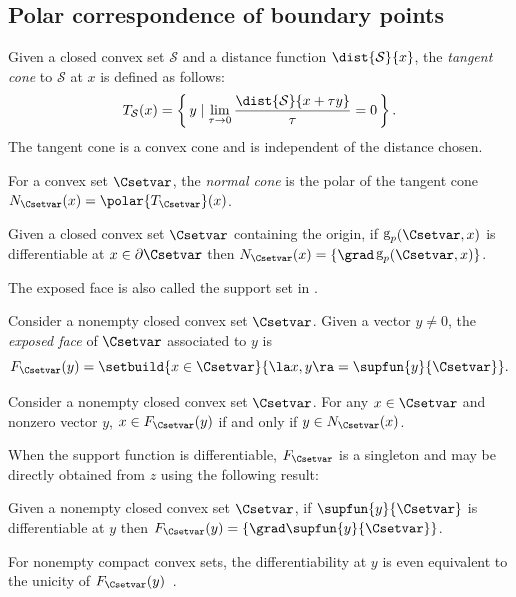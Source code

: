 \documentclass[11pt,twoside,a4paper,openright]{uclouvain-thesis}
\DeclareMathOperator{\gauge}{g}
\begin{document}
\subsection{Polar correspondence of boundary points}

\begin{mydef}
  Given a closed convex set $\mathcal{S}$ and a distance function $\dist{\mathcal{S}}{x}$,
  the \emph{tangent cone} to $\mathcal{S}$ at $x$ is defined as follows:
  \[ T_{\mathcal{S}}(x) = \left\{\, y \mid \lim_{\tau \to 0} \frac{\dist{\mathcal{S}}{x + \tau y}}{\tau} = 0 \,\right\}. \]
  The tangent cone is a convex cone and is independent of the distance chosen.
\end{mydef}


For a convex set $\Csetvar$, the \emph{normal cone} is the polar of the tangent cone $N_\Csetvar(x) = \polar{T_\Csetvar}(x)$.

\begin{myprop} %
  \label{prop:normal}
  Given a closed convex set $\Csetvar$ containing the origin,
  if $\gauge_p(\Csetvar, x)$ is differentiable at $x \in \partial \Csetvar$ then $N_{\Csetvar}(x) = \{\grad \gauge_p(\Csetvar, x)\}$.
\end{myprop}


The exposed face is also called the support set in \cite[Section~1.7.1]{schneider2013convex}.
\begin{mydef}
  Consider a nonempty closed convex set $\Csetvar$.
  Given a vector $y \neq 0$, the \emph{exposed face} of $\Csetvar$ associated
  to $y$ is
  \[
    F_\Csetvar(y) = \setbuild{x \in \Csetvar}{\la x, y \ra = \supfun{y}{\Csetvar}}.
  \]
\end{mydef}


\begin{myprop}
  \label{prop:normalsupfun}
  Consider a nonempty closed convex set $\Csetvar$.
  For any $x \in \Csetvar$ and nonzero vector $y$,
  $x \in F_\Csetvar(y)$ if and only if $y \in N_\Csetvar(x)$.
\end{myprop}

When the support function is differentiable, $F_\Csetvar$ is a singleton and may be directly obtained from $z$
using the following result:
\begin{myprop}
  \label{prop:exposed}
  Given a nonempty closed convex set $\Csetvar$,
  if $\supfun{y}{\Csetvar}$ is differentiable at $y$ then $F_{\Csetvar}(y) = \{\grad \supfun{y}{\Csetvar}\}$.
\end{myprop}
For nonempty compact convex sets, the differentiability at $y$ is even equivalent to the unicity of $F_{\Csetvar}(y)$~\cite[Corollary~1.7.3]{schneider2013convex}.
\end{document}
